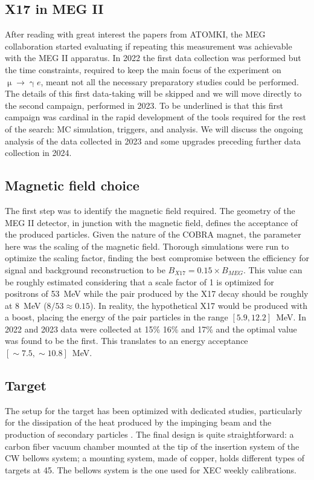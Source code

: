 \begin{refsection}
\section{X17 in MEG II}
    After reading with great interest the papers from ATOMKI, the MEG collaboration started evaluating if repeating this measurement was achievable with the MEG II apparatus.
    In 2022 the first data collection was performed but the time constraints, required to keep the main focus of the experiment on $\upmu \rightarrow \upgamma e$, meant not all the necessary preparatory studies could be performed.
    The details of this first data-taking will be skipped and we will move directly to the second campaign, performed in 2023. 
    To be underlined is that this first campaign was cardinal in the rapid development of the tools required for the rest of the search: MC simulation, triggers, and analysis.
    We will discuss the ongoing analysis of the data collected in 2023 and some upgrades preceding further data collection in 2024.
        
    \subsection{Magnetic field choice}
        The first step was to identify the magnetic field required. 
        The geometry of the MEG II detector, in junction with the magnetic field, defines the acceptance of the produced particles.
        Given the nature of the COBRA magnet, the parameter here was the scaling of the magnetic field.
        Thorough simulations were run to optimize the scaling factor, finding the best compromise between the efficiency for signal and background reconstruction to be $B_{X17}=0.15\times B_{MEG}$. 
        This value can be roughly estimated considering that a scale factor of 1 is optimized for positrons of \SI{53}{MeV} while the pair produced by the X17 decay should be roughly at \SI{8}{MeV} ($8/53\approx 0.15$). 
        In reality, the hypothetical X17 would be produced with a boost, placing the energy of the pair particles in the range $[5.9,12.2]$~MeV.
        In 2022 and 2023 data were collected at 15\% 16\% and 17\% and the optimal value was found to be the first.
        This translates to an energy acceptance $[\sim7.5,\sim10.8]$~MeV.
        
    \subsection{Target}
        The setup for the target has been optimized with dedicated studies, particularly for the dissipation of the heat produced by the impinging beam and the production of secondary particles \cite{X17:Meucci}. 
        The final design is quite straightforward: a carbon fiber vacuum chamber mounted at the tip of the insertion system of the CW bellows system; a mounting system, made of copper, holds different types of targets at \SI{45}{\deg}.
        The bellows system is the one used for XEC weekly calibrations.
        

\end{refsection}
